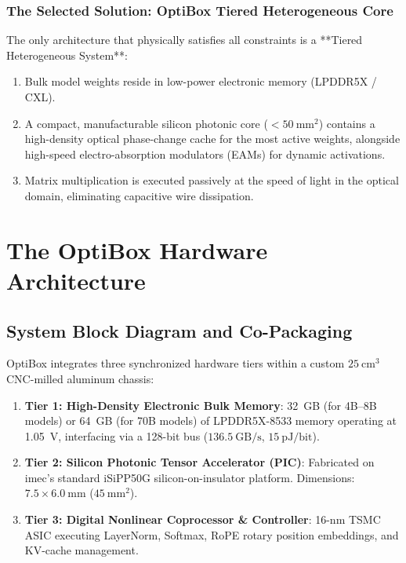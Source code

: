 \documentclass[11pt,a4paper]{report}
\begin{document}
\subsection{The Selected Solution: OptiBox Tiered Heterogeneous Core}
The only architecture that physically satisfies all constraints is a **Tiered Heterogeneous System**:
\begin{enumerate}
\item Bulk model weights reside in low-power electronic memory (LPDDR5X / CXL).
\item A compact, manufacturable silicon photonic core ($<50~\text{mm}^2$) contains a high-density optical phase-change cache for the most active weights, alongside high-speed electro-absorption modulators (EAMs) for dynamic activations.
\item Matrix multiplication is executed passively at the speed of light in the optical domain, eliminating capacitive wire dissipation.
\end{enumerate}

\chapter{The OptiBox Hardware Architecture}

\section{System Block Diagram and Co-Packaging}
OptiBox integrates three synchronized hardware tiers within a custom $25~\text{cm}^3$ CNC-milled aluminum chassis:

\begin{enumerate}
\item \textbf{Tier 1: High-Density Electronic Bulk Memory}: 32~GB (for 4B--8B models) or 64~GB (for 70B models) of LPDDR5X-8533 memory operating at 1.05~V, interfacing via a 128-bit bus ($136.5~\text{GB/s}$, $15~\text{pJ/bit}$).
\item \textbf{Tier 2: Silicon Photonic Tensor Accelerator (PIC)}: Fabricated on imec's standard iSiPP50G silicon-on-insulator platform. Dimensions: $7.5 \times 6.0~\text{mm}$ ($45~\text{mm}^2$).
\item \textbf{Tier 3: Digital Nonlinear Coprocessor \& Controller}: 16-nm TSMC ASIC executing LayerNorm, Softmax, RoPE rotary position embeddings, and KV-cache management.
\end{enumerate}
\end{document}
